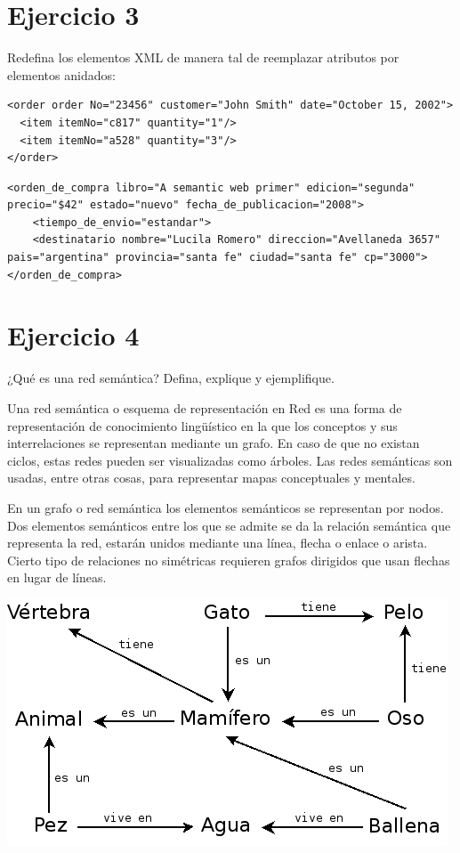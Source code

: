 \documentclass[a4paper,12pt,twoside,final,spanish]{article}
\begin{document}
\section*{Ejercicio 3}

Redefina los elementos XML de manera tal de reemplazar atributos por elementos anidados:

\begin{lstlisting}
<order order No="23456" customer="John Smith" date="October 15, 2002"> 
  <item itemNo="c817" quantity="1"/> 
  <item itemNo="a528" quantity="3"/> 
</order>
\end{lstlisting}

\dotfill

\begin{lstlisting}
<orden_de_compra libro="A semantic web primer" edicion="segunda" precio="$42" estado="nuevo" fecha_de_publicacion="2008"> 
	<tiempo_de_envio="estandar">
	<destinatario nombre="Lucila Romero" direccion="Avellaneda 3657" pais="argentina" provincia="santa fe" ciudad="santa fe" cp="3000">
</orden_de_compra>
\end{lstlisting}

\section*{Ejercicio 4}

¿Qué es una red semántica? Defina, explique y ejemplifique.

\dotfill

Una red semántica o esquema de representación en Red es una forma de representación de conocimiento lingüístico en la que los conceptos y sus interrelaciones se representan mediante un grafo. En caso de que no existan ciclos, estas redes pueden ser visualizadas como árboles. Las redes semánticas son usadas, entre otras cosas, para representar mapas conceptuales y mentales.

En un grafo o red semántica los elementos semánticos se representan por nodos. Dos elementos semánticos entre los que se admite se da la relación semántica que representa la red, estarán unidos mediante una línea, flecha o enlace o arista. Cierto tipo de relaciones no simétricas requieren grafos dirigidos que usan flechas en lugar de líneas.

\begin{center}
\includegraphics[width=0.9\linewidth,keepaspectratio]{5.png}
\end{center}
\end{document}
